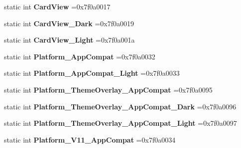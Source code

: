 \begin{DoxyCompactItemize}
static int {\bfseries Card\+View} =0x7f0a0017
\item 
\mbox{\label{classandroid_1_1support_1_1v4_1_1R_1_1style_aeb5a57cff380be2fc1459cc24545039f}} 
static int {\bfseries Card\+View\+\_\+\+Dark} =0x7f0a0019
\item 
\mbox{\label{classandroid_1_1support_1_1v4_1_1R_1_1style_ab94bcd8b368c41edf1d0673c311c4b5a}} 
static int {\bfseries Card\+View\+\_\+\+Light} =0x7f0a001a
\item 
\mbox{\label{classandroid_1_1support_1_1v4_1_1R_1_1style_aed97bbbdff2a04a52bc4fb6936d89c4a}} 
static int {\bfseries Platform\+\_\+\+App\+Compat} =0x7f0a0032
\item 
\mbox{\label{classandroid_1_1support_1_1v4_1_1R_1_1style_a65ebe7d912b0c99705e67f4536200128}} 
static int {\bfseries Platform\+\_\+\+App\+Compat\+\_\+\+Light} =0x7f0a0033
\item 
\mbox{\label{classandroid_1_1support_1_1v4_1_1R_1_1style_a46653bfcacf7c1e9fa25befdca2c04bc}} 
static int {\bfseries Platform\+\_\+\+Theme\+Overlay\+\_\+\+App\+Compat} =0x7f0a0095
\item 
\mbox{\label{classandroid_1_1support_1_1v4_1_1R_1_1style_ae1fb0957f38d9f4304e01b6779ae4981}} 
static int {\bfseries Platform\+\_\+\+Theme\+Overlay\+\_\+\+App\+Compat\+\_\+\+Dark} =0x7f0a0096
\item 
\mbox{\label{classandroid_1_1support_1_1v4_1_1R_1_1style_a3d5706e86580b6a089061fbff4c407dd}} 
static int {\bfseries Platform\+\_\+\+Theme\+Overlay\+\_\+\+App\+Compat\+\_\+\+Light} =0x7f0a0097
\item 
\mbox{\label{classandroid_1_1support_1_1v4_1_1R_1_1style_a3bb4574725ef46a9c36b9105ce67bb3e}} 
static int {\bfseries Platform\+\_\+\+V11\+\_\+\+App\+Compat} =0x7f0a0034
\item 
\mbox{\label{classandroid_1_1support_1_1v4_1_1R_1_1style_a456f2e0be6c635ec826988c3e52a72b6}} 

\end{DoxyCompactItemize}
